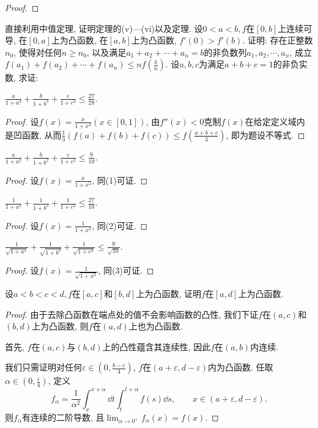 \begin{quiza}
\begin{proof}
\end{proof}
\woe 直接利用中值定理, 证明定理的(v)---(vi)以及定理.
\woe 设\(0<a<b,f\)在\([0,b]\)上连续可导, 在\([0,a]\)上为凸函数, 在\([a,b]\)上为凸函数, \(f'(0)>f'(b)\). 证明: 存在正整数\(n_0\), 使得对任何\(n\geqslant n_0\), 以及满足\(a_1+a_2+\cdots+a_n=b\)的非负数列\(a_1,a_2,\cdots,a_n\), 成立\(f(a_1)+f(a_2)+\cdots+f(a_n)\leqslant nf\left(\frac{b}{n}\right)\).
\woe 设\(a,b,c\)为满足\(a+b+c=1\)的非负实数, 求证:\begin{quizs}
\def\tempf#1{\frac{a}{1+a^#1}+\frac{b}{1+b^#1}+\frac{c}{1+c^#1}}
\def\tempff#1{\frac{1}{1+a^#1}+\frac{1}{1+b^#1}+\frac{1}{1+c^#1}}
\item \(\tempf{3}\leqslant\frac{27}{28}\).
\begin{proof}
设\(f(x)=\frac{x}{1+x^3}(x\in[0,1])\), 由\(f''(x)<0\)克制\(f(x)\)在给定定义域内是凹函数, 从而\(\frac{1}{3}\left(f(a)+f(b)+f(c)\right)\leqslant f\left(\frac{a+b+c}{3}\right)\), 即为题设不等式.
\end{proof}
\item \(\tempf{2}\leqslant\frac{9}{10}\).
\begin{proof}
设\(f(x)=\frac{x}{1+x^2}\), 同(1)可证. 
\end{proof}
\item \(\tempff{2}\leqslant\frac{27}{10}\).
\begin{proof}
设\(f(x)=\frac{1}{1+x^2}\), 同(2)可证.
\end{proof}
\item \(\frac{1}{\sqrt{1+a^2}}+\frac{1}{\sqrt{1+b^2}}+\frac{1}{\sqrt{1+c^2}}\leqslant\frac{9}{\sqrt{10}}.\)
\begin{proof}
设\(f(x)=\frac{1}{\sqrt{1+x^2}}\), 同(3)可证.
\end{proof}
\end{quizs}
\woe 设\(a<b<c<d,f\)在\([a,c]\)和\([b,d]\)上为凸函数, 证明\(f\)在\([a,d]\)上为凸函数.
\begin{proof}
由于去除凸函数在端点处的值不会影响函数的凸性, 我们下证\(f\)在\((a,c)\)和\((b,d)\)上为凸函数, 则\(f\)在\((a,d)\)上也为凸函数.

首先, \(f\)在\((a,c)\)与\((b,d)\)上的凸性蕴含其连续性, 因此\(f\)在\((a,b)\)内连续.

我们只需证明对任何\(\varepsilon\in\left(0,\frac{b-c}{4}\right)\), \(f\)在\((a+\varepsilon,d-\varepsilon)\)内为凸函数. 任取\(\alpha\in\left(0,\frac{\varepsilon}{4}\right)\), 定义\[f_{\alpha}=\frac{1}{\alpha^2}\int_{x}^{x+\alpha}\dd t\int_{t}^{t+\alpha}f(s)\dd s,\qquad x\in(a+\varepsilon,d-\varepsilon).\]则\(f_{\alpha}\)有连续的二阶导数, 且\(\lim_{\alpha\rightarrow 0^+}f_{\alpha}(x)=f(x)\).


\end{proof}
\end{quiza}
